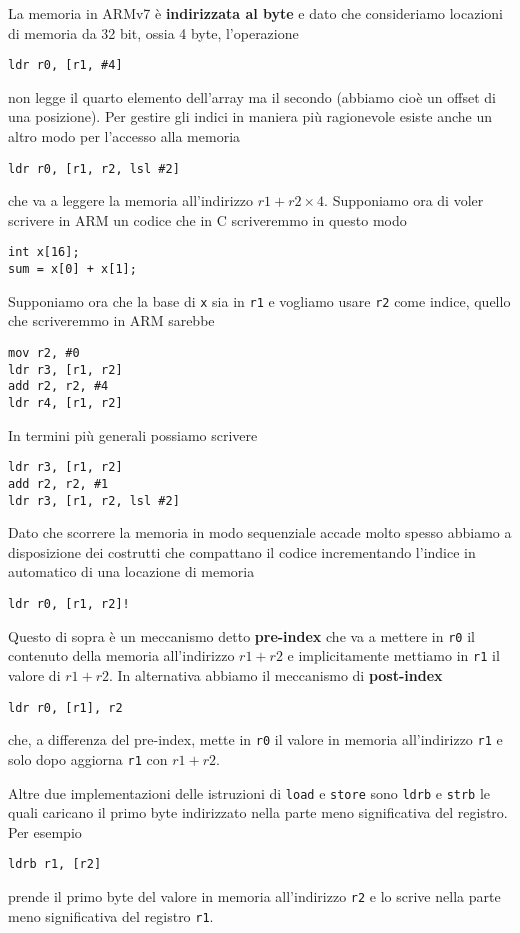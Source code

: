 La memoria in ARMv7 è \textbf{indirizzata al byte} e dato che consideriamo locazioni di memoria da
32 bit, ossia 4 byte, l'operazione
\begin{verbatim}
ldr r0, [r1, #4]
\end{verbatim}
non legge il quarto elemento dell'array ma il secondo (abbiamo cioè un offset di una posizione).
Per gestire gli indici in maniera più ragionevole esiste anche un altro modo per l'accesso alla
memoria
\begin{verbatim}
ldr r0, [r1, r2, lsl #2]
\end{verbatim}
che va a leggere la memoria all'indirizzo $r1 + r2 \times 4$. Supponiamo ora di voler scrivere in
ARM un codice che in C scriveremmo in questo modo
\begin{verbatim}
int x[16];
sum = x[0] + x[1];	
\end{verbatim}
Supponiamo ora che la base di \verb|x| sia in \verb|r1| e vogliamo usare \verb|r2| come indice,
quello che scriveremmo in ARM sarebbe
\begin{verbatim}
mov r2, #0
ldr r3, [r1, r2]
add r2, r2, #4
ldr r4, [r1, r2]
\end{verbatim}
In termini più generali possiamo scrivere
\begin{verbatim}
ldr r3, [r1, r2]
add r2, r2, #1
ldr r3, [r1, r2, lsl #2]
\end{verbatim}
Dato che scorrere la memoria in modo sequenziale accade molto spesso abbiamo a disposizione dei
costrutti che compattano il codice incrementando l'indice in automatico di una locazione di memoria
\begin{verbatim}
ldr r0, [r1, r2]!
\end{verbatim}
Questo di sopra è un meccanismo detto \textbf{pre-index} che va a mettere in \verb|r0| il contenuto
della memoria all'indirizzo $r1 + r2$ e implicitamente mettiamo in \verb|r1| il valore di $r1 + r2$.
In alternativa abbiamo il meccanismo di \textbf{post-index}
\begin{verbatim}
ldr r0, [r1], r2
\end{verbatim}
che, a differenza del pre-index, mette in \verb|r0| il valore in memoria all'indirizzo \verb|r1| e
solo dopo aggiorna \verb|r1| con $r1 + r2$.

Altre due implementazioni delle istruzioni di \verb|load| e \verb|store| sono \verb|ldrb| e
\verb|strb| le quali caricano il primo byte indirizzato nella parte meno significativa del
registro. Per esempio
\begin{verbatim}
ldrb r1, [r2]
\end{verbatim}
prende il primo byte del valore in memoria all'indirizzo \verb|r2| e lo scrive nella parte meno
significativa del registro \verb|r1|.

